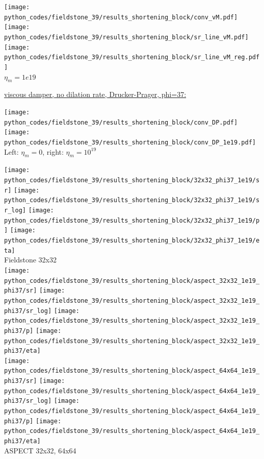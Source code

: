 \begin{center}
\texttt{[image: python\_codes/fieldstone\_39/results\_shortening\_block/conv\_vM.pdf]}
\texttt{[image: python\_codes/fieldstone\_39/results\_shortening\_block/sr\_line\_vM.pdf]}
\texttt{[image: python\_codes/fieldstone\_39/results\_shortening\_block/sr\_line\_vM\_reg.pdf]}\\
{\captionfont $\eta_m=1e19$}
\end{center}




\newpage
\underline{viscous damper, no dilation rate, Drucker-Prager, phi=37:}


\begin{center}
\texttt{[image: python\_codes/fieldstone\_39/results\_shortening\_block/conv\_DP.pdf]}
\texttt{[image: python\_codes/fieldstone\_39/results\_shortening\_block/conv\_DP\_1e19.pdf]}\\
{\captionfont Left: $\eta_m=0$, right: $\eta_m=10^{19}$}
\end{center}


\begin{center}
\texttt{[image: python\_codes/fieldstone\_39/results\_shortening\_block/32x32\_phi37\_1e19/sr]}
\texttt{[image: python\_codes/fieldstone\_39/results\_shortening\_block/32x32\_phi37\_1e19/sr\_log]}
\texttt{[image: python\_codes/fieldstone\_39/results\_shortening\_block/32x32\_phi37\_1e19/p]}
\texttt{[image: python\_codes/fieldstone\_39/results\_shortening\_block/32x32\_phi37\_1e19/eta]}\\
{\captionfont Fieldstone 32x32}\\
\texttt{[image: python\_codes/fieldstone\_39/results\_shortening\_block/aspect\_32x32\_1e19\_phi37/sr]}
\texttt{[image: python\_codes/fieldstone\_39/results\_shortening\_block/aspect\_32x32\_1e19\_phi37/sr\_log]}
\texttt{[image: python\_codes/fieldstone\_39/results\_shortening\_block/aspect\_32x32\_1e19\_phi37/p]}
\texttt{[image: python\_codes/fieldstone\_39/results\_shortening\_block/aspect\_32x32\_1e19\_phi37/eta]}\\
\texttt{[image: python\_codes/fieldstone\_39/results\_shortening\_block/aspect\_64x64\_1e19\_phi37/sr]}
\texttt{[image: python\_codes/fieldstone\_39/results\_shortening\_block/aspect\_64x64\_1e19\_phi37/sr\_log]}
\texttt{[image: python\_codes/fieldstone\_39/results\_shortening\_block/aspect\_64x64\_1e19\_phi37/p]}
\texttt{[image: python\_codes/fieldstone\_39/results\_shortening\_block/aspect\_64x64\_1e19\_phi37/eta]}\\
{\captionfont ASPECT 32x32, 64x64} 
\end{center}



